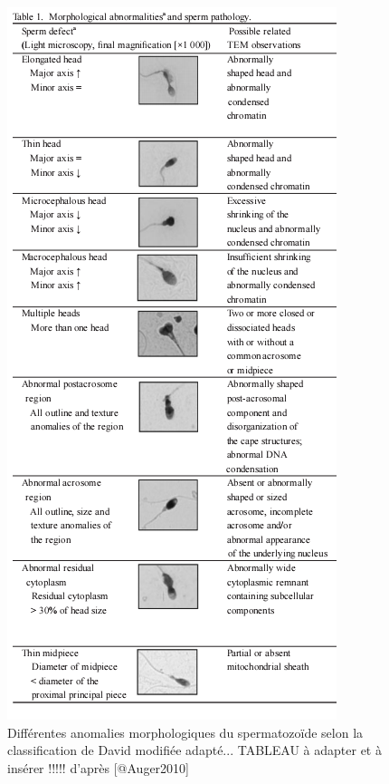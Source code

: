 \documentclass[12pt,twoside]{reedthesis}
\theoremstyle{definition}
\theoremstyle{definition}
\theoremstyle{remark}
\begin{document}
  \begin{figure}
  
  {\centering \includegraphics[scale=.75]{figure/sperm_morpho_abnormalities} 
  
  }
  
  \caption[Différentes anomalies morphologiques du spermatozoïde selon la classification de David modifiée adapté... TABLEAU à adapter et à insérer !!!!!]{Différentes anomalies morphologiques du spermatozoïde selon la classification de David modifiée adapté... TABLEAU à adapter et à insérer !!!!! d'après [@Auger2010]}\label{fig:anomaliemorphosperm}
  \end{figure}
  
  \newpage
  
\end{document}
